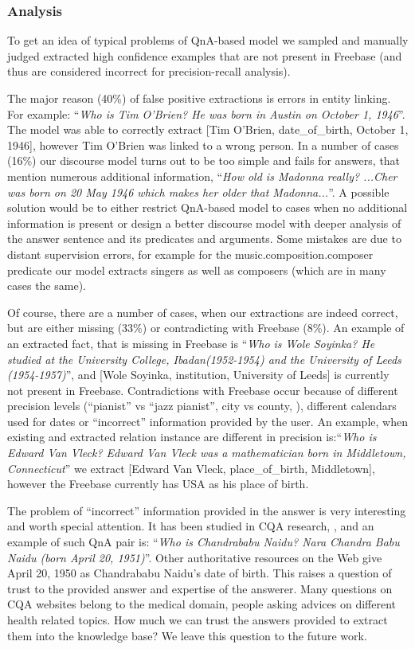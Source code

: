 \subsubsection{Analysis}

To get an idea of typical problems of QnA-based model we sampled and manually judged extracted high confidence examples that are not present in Freebase (and thus are considered incorrect for precision-recall analysis).

The major reason (40\%) of false positive extractions is errors in entity linking.
For example: ``\emph{Who is Tim O'Brien? He was born in Austin on October 1, 1946}''.
The model was able to correctly extract [Tim O'Brien, date\_of\_birth, October 1, 1946], however Tim O'Brien was linked to a wrong person.
In a number of cases (16\%) our discourse model turns out to be too simple and fails for answers, that mention numerous additional information, \eg ``\emph{How old is Madonna really? ...Cher was born on 20 May 1946 which makes her older that Madonna...}''.
A possible solution would be to either restrict QnA-based model to cases when no additional information is present or design a better discourse model with deeper analysis of the answer sentence and its predicates and arguments.
Some mistakes are due to distant supervision errors, for example for the music.composition.composer predicate our model extracts singers as well as composers (which are in many cases the same).

Of course, there are a number of cases, when our extractions are indeed correct, but are either missing (33\%) or contradicting with Freebase (8\%).
An example of an extracted fact, that is missing in Freebase is ``\emph{Who is Wole Soyinka? He studied at the University College, Ibadan(1952-1954) and the University of Leeds (1954-1957)}'', and [Wole Soyinka, institution, University of Leeds] is currently not present in Freebase.
Contradictions with Freebase occur because of different precision levels (``pianist'' vs ``jazz pianist'', city vs county, \etc), different calendars used for dates or ``incorrect'' information provided by the user.
An example, when existing and extracted relation instance are different in precision is:``\emph{Who is Edward Van Vleck? Edward Van Vleck was a mathematician born in Middletown, Connecticut}'' we extract [Edward Van Vleck, place\_of\_birth, Middletown], however the Freebase currently has USA as his place of birth.

The problem of ``incorrect'' information provided in the answer is very interesting and worth special attention.
It has been studied in CQA research, \eg \cite{shah2010evaluating}, and an example of such QnA pair is: ``\emph{Who is Chandrababu Naidu? Nara Chandra Babu Naidu (born April 20, 1951)}''.
Other authoritative resources on the Web give April 20, 1950 as Chandrababu Naidu's date of birth.
This raises a question of trust to the provided answer and expertise of the answerer.
Many questions on CQA websites belong to the medical domain, \eg people asking advices on different health related topics.
How much we can trust the answers provided to extract them into the knowledge base?
We leave this question to the future work.

